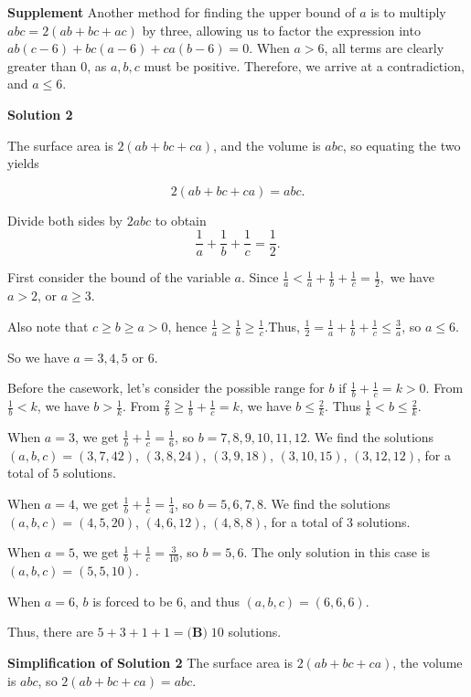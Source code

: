 \begin{enumerate}
 \textbf{Supplement} Another method for finding the upper bound of $a$ is to multiply $abc = 2(ab+bc+ac)$ by three, allowing us to factor the expression into $ab(c-6) + bc(a-6) + ca(b-6) = 0$. When $a > 6$, all terms are clearly greater than $0$, as $a, b , c$ must be positive. Therefore, we arrive at a contradiction, and $a \leq 6$.

 



\textbf{Solution 2}

The surface area is $2(ab+bc+ca)$, and the volume is $abc$, so equating the two yields 

 
 \[2(ab+bc+ca)=abc.\]

 Divide both sides by $2abc$ to obtain 
 \[\frac{1}{a}+\frac{1}{b}+\frac{1}{c}=\frac{1}{2}.\]

 First consider the bound of the variable $a$. Since $\frac{1}{a}<\frac{1}{a}+\frac{1}{b}+\frac{1}{c}=\frac{1}{2},$ we have $a>2$, or $a\geqslant3$.

 Also note that $c \geq b \geq a > 0$, hence $\frac{1}{a} \geq \frac{1}{b}  \geq \frac{1}{c}$.Thus, $\frac{1}{2}=\frac{1}{a}+\frac{1}{b}+\frac{1}{c} \leq \frac{3}{a}$, so $a \leq 6$.

 So we have $a=3, 4, 5$ or $6$.

 Before the casework, let's consider the possible range for $b$ if $\frac{1}{b}+\frac{1}{c}=k>0$. From $\frac{1}{b}<k$, we have $b>\frac{1}{k}$. From $\frac{2}{b} \geq \frac{1}{b}+\frac{1}{c}=k$, we have $b \leq \frac{2}{k}$. Thus $\frac{1}{k}<b \leq \frac{2}{k}$.

 When $a=3$, we get $\frac{1}{b}+\frac{1}{c}=\frac{1}{6}$, so $b=7, 8, 9, 10, 11, 12$. We find the solutions $(a, b, c)=(3, 7, 42)$, $(3, 8, 24)$, $(3, 9, 18)$, $(3, 10, 15)$, $(3, 12, 12)$, for a total of $5$ solutions.

 When $a=4$, we get $\frac{1}{b}+\frac{1}{c}=\frac{1}{4}$, so $b=5, 6, 7, 8$. We find the solutions $(a, b, c)=(4, 5, 20)$, $(4, 6, 12)$, $(4, 8, 8)$, for a total of $3$ solutions.

 When $a=5$, we get $\frac{1}{b}+\frac{1}{c}=\frac{3}{10}$, so $b=5, 6$. The only solution in this case is $(a, b, c)=(5, 5, 10)$.

 When $a=6$, $b$ is forced to be $6$, and thus $(a, b, c)=(6, 6, 6)$.

 Thus, there are $5+3+1+1 = \boxed{\textbf{(B)}\; 10}$ solutions.

 \textbf{Simplification of Solution 2} The surface area is $2(ab+bc+ca)$, the volume is $abc$, so $2(ab+bc+ca)=abc$.


\end{enumerate}
